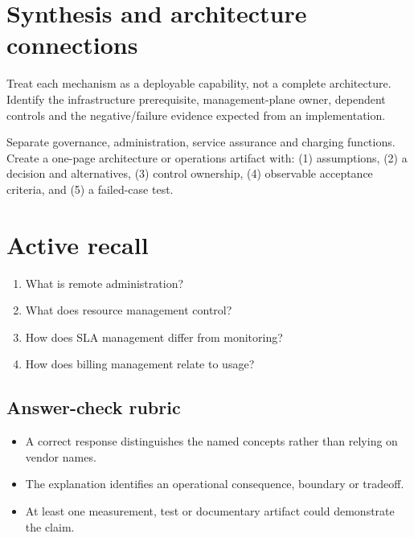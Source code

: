 \documentclass[10pt,letterpaper]{article}
\begin{document}
\section{Synthesis and architecture connections}
Treat each mechanism as a deployable capability, not a complete architecture. Identify the infrastructure prerequisite, management-plane owner, dependent controls and the negative/failure evidence expected from an implementation.
\begin{workbox}[title={Applied deliverable}]
Separate governance, administration, service assurance and charging functions.\\[4pt]Create a one-page architecture or operations artifact with: (1) assumptions, (2) a decision and alternatives, (3) control ownership, (4) observable acceptance criteria, and (5) a failed-case test.
\end{workbox}
\section{Active recall}
\begin{enumerate}
\item What is remote administration?
\item What does resource management control?
\item How does SLA management differ from monitoring?
\item How does billing management relate to usage?
\end{enumerate}
\subsection{Answer-check rubric}
\begin{itemize}
\item A correct response distinguishes the named concepts rather than relying on vendor names.
\item The explanation identifies an operational consequence, boundary or tradeoff.
\item At least one measurement, test or documentary artifact could demonstrate the claim.
\end{itemize}
\end{document}
